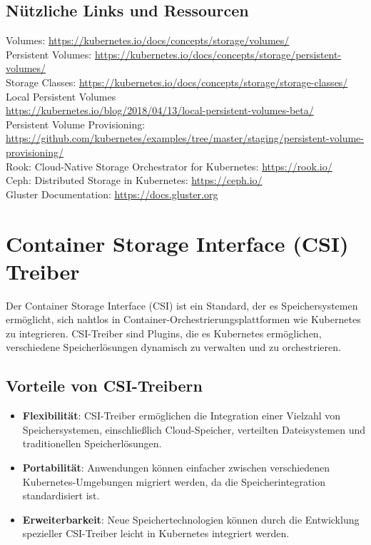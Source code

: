 \subsection{Nützliche Links und Ressourcen}
Volumes: \url{https://kubernetes.io/docs/concepts/storage/volumes/}\\
Persistent Volumes: \url{https://kubernetes.io/docs/concepts/storage/persistent-volumes/}\\
Storage Classes: \url{https://kubernetes.io/docs/concepts/storage/storage-classes/}\\
Local Persistent Volumes \\
\url{https://kubernetes.io/blog/2018/04/13/local-persistent-volumes-beta/}\\
Persistent Volume Provisioning: \\
\url{https://github.com/kubernetes/examples/tree/master/staging/persistent-volume-provisioning/}\\
Rook: Cloud-Native Storage Orchestrator for Kubernetes: \url{https://rook.io/}\\
Ceph: Distributed Storage in Kubernetes: \url{https://ceph.io/}\\
Gluster Documentation: \url{https://docs.gluster.org}


\section{Container Storage Interface (CSI) Treiber}
Der Container Storage Interface (CSI) ist ein Standard, der es Speichersystemen ermöglicht, sich nahtlos in Container-Orchestrierungsplattformen wie Kubernetes zu integrieren. CSI-Treiber sind Plugins, die es Kubernetes ermöglichen, verschiedene Speicherlösungen dynamisch zu verwalten und zu orchestrieren.

\subsection{Vorteile von CSI-Treibern}
\begin{itemize}
    \item \textbf{Flexibilität}: CSI-Treiber ermöglichen die Integration einer Vielzahl von Speichersystemen, einschließlich Cloud-Speicher, verteilten Dateisystemen und traditionellen Speicherlösungen.
    \item \textbf{Portabilität}: Anwendungen können einfacher zwischen verschiedenen Kubernetes-Umgebungen migriert werden, da die Speicherintegration standardisiert ist.
    \item \textbf{Erweiterbarkeit}: Neue Speichertechnologien können durch die Entwicklung spezieller CSI-Treiber leicht in Kubernetes integriert werden.
\end{itemize}

